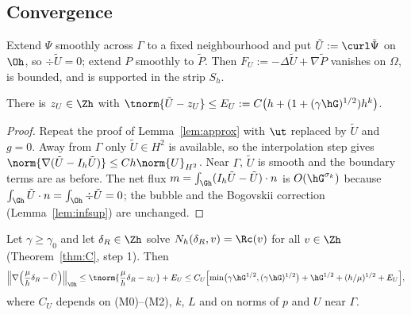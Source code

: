 \subsection{Convergence}

Extend $\Psi$ smoothly across $\Gamma$ to a fixed neighbourhood and put $\tilde U:=\curl\tilde\Psi$ on $\Oh$, so $\div\tilde U=0$;
extend $P$ smoothly to $\tilde P$. Then $F_U:=-\Delta\tilde U+\nabla\tilde P$ vanishes on $\Omega$, is bounded, and is supported in
the strip $S_h$.

\begin{lemma}\label{hc:approx}
There is $z_U\in\Zh$ with $\tnorm{\tilde U-z_U}\le E_U:=C\bigl(h+(1+(\gamma\hG)^{1/2})h^k\bigr)$.
\end{lemma}

\begin{proof}
Repeat the proof of Lemma~\ref{lem:approx} with $\ut$ replaced by $\tilde U$ and $g=0$. Away from $\Gamma$ only $\tilde U\in
H^2$ is available, so the interpolation step gives $\norm{\nabla(\tilde U-I_h\tilde U)}\le Ch\norm{U}_{H^2}$. Near $\Gamma$, $\tilde U$
is smooth and the boundary terms are as before. The net flux $m=\int_{\Gh}(I_h\tilde U-\tilde U)\cdot n$ is $O(\hG^{\sigma_k})$
because $\int_{\Gh}\tilde U\cdot n=\int_{\Oh}\div\tilde U=0$; the bubble and the Bogovskii correction (Lemma~\ref{lem:infsup})
are unchanged.
\end{proof}

\begin{theorem}\label{hc:thm}
Let $\gamma\ge\gamma_0$ and let $\delta_R\in\Zh$ solve $N_h(\delta_R,v)=\Rc(v)$ for all $v\in\Zh$ (Theorem~\ref{thm:C}, step 1).
Then
\[
\Bigl\|\nabla\Bigl(\frac\mu h\delta_R-\tilde U\Bigr)\Bigr\|_{\Oh}
\le\tnorm{\frac\mu h\delta_R-z_U}+E_U
\le C_U\Bigl[\min\bigl(\gamma\hG^{1/2},(\gamma\hG)^{1/2}\bigr)+\hG^{1/2}+(h/\mu)^{1/2}+E_U\Bigr],
\]
where $C_U$ depends on (M0)--(M2), $k$, $L$ and on norms of $p$ and $U$ near $\Gamma$.
\end{theorem}

